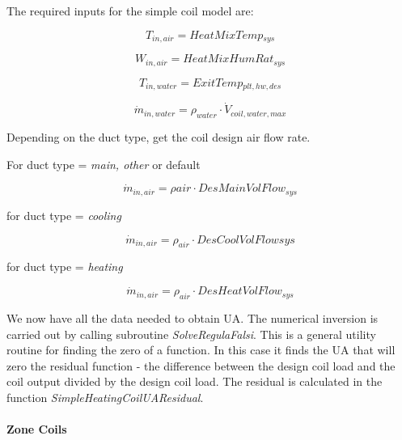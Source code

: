 The required inputs for the simple coil model are:

\begin{equation}
\textit{T\(_{in,air}\)} = \textit{HeatMixTemp\(_{sys}\)}
\end{equation}

\begin{equation}
\textit{W\(_{in,air}\)} = \textit{HeatMixHumRat\(_{sys}\)}
\end{equation}

\begin{equation}
\textit{T\(_{in,water}\)} = \textit{ExitTemp\(_{plt,hw,des}\)}
\end{equation}

\begin{equation}
\dot m_{in,water} = \rho_{water} \cdot \dot V_{coil,water,max}
\end{equation}

Depending on the duct type, get the coil design air flow rate.

For duct type = \emph{main, other} or default

\begin{equation}
\textit{\(\dot m_{in,air} = \rho{air} \cdot DesMainVolFlow_{sys}\)}
\end{equation}

for duct type = \emph{cooling}

\begin{equation}
\textit{\(\dot m_{in,air} = \rho_{air} \cdot DesCoolVolFlowsys\)}
\end{equation}

for duct type = \emph{heating}

\begin{equation}
\dot m_{in,air} = \rho_{air} \cdot DesHeatVolFlow_{sys}
\end{equation}

We now have all the data needed to obtain UA. The numerical inversion is carried out by calling subroutine \emph{SolveRegulaFalsi}. This is a general utility routine for finding the zero of a function. In this case it finds the UA that will zero the residual function - the difference between the design coil load and the coil output divided by the design coil load. The residual is calculated in the function \emph{SimpleHeatingCoilUAResidual}.

\paragraph{Zone Coils}\label{zone-coils-1}


